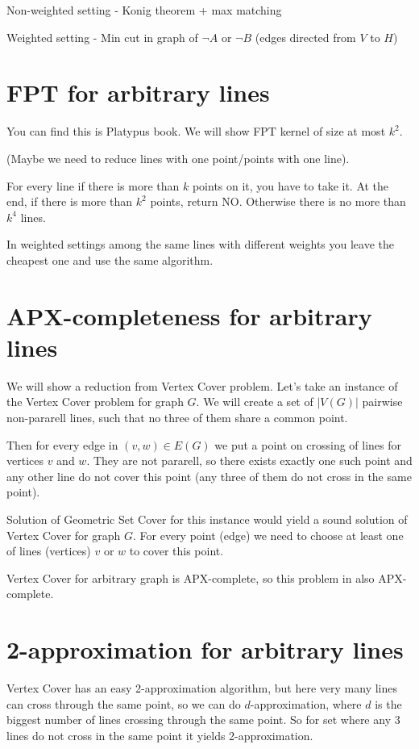 \documentclass[en]{pracamgr}
\theoremstyle{plain}
\theoremstyle{definition}
\begin{document}
Non-weighted setting - Konig theorem + max matching

Weighted setting - Min cut in graph of $\neg A$ or $\neg B$
(edges directed from $V$ to $H$)

\section{FPT for arbitrary lines}
You can find this is Platypus book.
We will show FPT kernel of size at most $k^2$.

(Maybe we need to reduce lines with one point/points with one line).

For every line if there is more than $k$ points on it,
you have to take it. At the end, if there is more than $k^2$ points,
return NO.
Otherwise there is no more than $k^4$ lines.

In weighted settings among the same lines with different weights
you leave the cheapest one and use the same algorithm.

\section{APX-completeness for arbitrary lines}
We will show a reduction from Vertex Cover problem.
Let's take an instance of the Vertex Cover problem for graph $G$.
We will create a set of $|V(G)|$ pairwise non-pararell lines,
such that no three of them share a common point.

Then for every edge in $(v, w) \in E(G)$
we put a point on crossing of lines for vertices $v$ and $w$.
They are not pararell, so there exists exactly one such point
and any other line do not cover this point (any three of them do not
cross in the same point).

Solution of Geometric Set Cover for this instance would yield
a sound solution of Vertex Cover for graph $G$.
For every point (edge) we need to choose at least one of
lines (vertices) $v$ or $w$ to cover this point.

Vertex Cover for arbitrary graph is APX-complete,
so this problem in also APX-complete.

\section{2-approximation for arbitrary lines}
Vertex Cover has an easy 2-approximation algorithm,
but here very many lines can cross through
the same point, so we can do $d$-approximation,
where $d$ is the biggest number of lines crossing through the same point.
So for set where any 3 lines do not cross in the same point
it yields 2-approximation.
\end{document}
